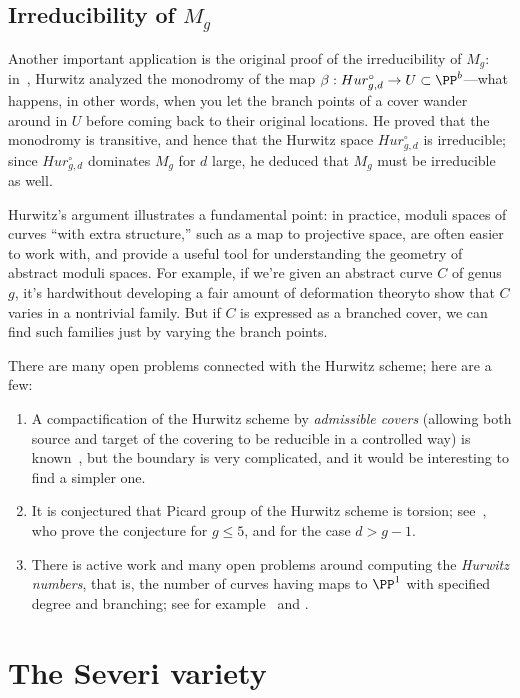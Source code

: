 \subsection{Irreducibility of $M_g$}

Another important application is the original proof of the irreducibility of $M_g$: in~\cite{Hurwitz}, Hurwitz analyzed the monodromy of the map $\beta: Hur^\circ_{g,d} \to U \subset \PP^b$---what happens, in other words, when you let the branch points of a cover wander around in $U$ before coming back to their original locations. He proved that the monodromy is transitive, and hence that the Hurwitz space $Hur^\circ_{g,d}$ is irreducible; since $Hur^\circ_{g,d}$ dominates $M_g$ for $d$ large, he deduced that $M_g$ must be irreducible as well.

Hurwitz's argument illustrates a fundamental point: in practice,
moduli spaces of curves ``with extra structure,'' such as a map to
projective space, are often easier to work with, and provide a useful
tool for understanding the geometry of abstract moduli spaces. For
example, if we're given an abstract curve $C$ of genus $g$, it's
hard\emdash without developing a fair amount of deformation
theory\emdash to show that $C$ varies in a nontrivial family. But if
$C$ is expressed as a branched cover, we can find such families just
by varying the branch points.

There are many open problems connected with the Hurwitz scheme; here are a few:
\begin{enumerate}
 \item A compactification of the Hurwitz scheme by \emph{admissible covers} (allowing both source and target
of the covering to be reducible in a controlled way) is known~\cite{MR1631825}, but the boundary is very complicated, and it would be interesting to find a simpler one.

\item It is conjectured that  Picard group of the Hurwitz scheme is torsion; see~\cite{MR3320849}, who prove the conjecture for $g\leq 5$, and \cite{mullane} for the case $d>g-1$.

\item There is active work and many open problems around computing the \emph{Hurwitz numbers}, that is,
the number of curves having maps to $\PP^{1}$ with specified degree and branching; see for example~\cite{Hurwitz2} and \cite{ELSV}.
\end{enumerate}

\section{The Severi variety}\label{severi variety}

